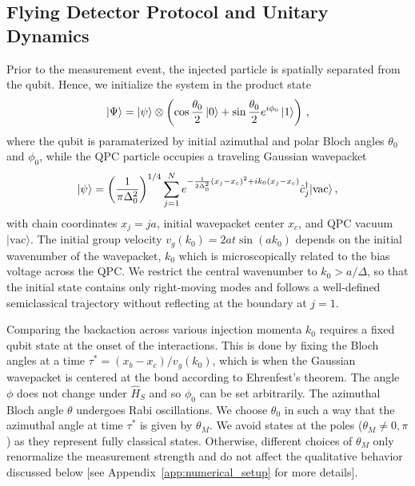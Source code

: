 \documentclass[10pt,
 amsmath,amssymb,
 aps,prb, twocolumn
]{revtex4-2}
\begin{document}
\subsection{Flying Detector Protocol and Unitary Dynamics}\label{sect:protocol}
Prior to the measurement event, the injected particle is spatially separated from the qubit. Hence, we initialize the system in the product state
\begin{equation}\label{eq:initial_state}
    \ket{\Psi} = \ket{\psi}\otimes\left(\cos{\frac{\theta_0}{2}}\ket{0}+\sin{\frac{\theta_0}{2}}e^{i\phi_0}\ket{1}\right) \,,
\end{equation}
where the qubit is paramaterized by initial azimuthal and polar Bloch angles $\theta_0$ and $\phi_0$, while the QPC particle occupies a traveling Gaussian wavepacket
\begin{equation}\label{eq:gauss_wavepacket}
    \ket{\psi} = \left(\frac{1}{\pi \Delta_0^2}\right)^{1 / 4} \sum_{j=1}^N e^{-\frac{1}{2 \Delta_0^2}\left(x_j-x_c\right)^2+i k_0\left(x_j-x_c\right)} \hat{c}_j^{\dagger}|\text{vac}\rangle \,,
\end{equation}
with chain coordinates $x_j=ja$, initial wavepacket center $x_c$, and QPC vacuum $|\text{vac}\rangle$. The initial group velocity $v_g(k_0) = 2at\sin(ak_0)$ depends on the initial wavenumber of the wavepacket, \mbox{$k_0$} which is microscopically related to the bias voltage across the QPC. We restrict the central wavenumber to $k_0 > a/\Delta$, so that the initial state contains only right-moving modes and follows a well-defined semiclassical trajectory without reflecting at the boundary at \mbox{$j=1$}.

Comparing the backaction across various injection momenta \mbox{$k_0$} requires a fixed qubit state at the onset of the interactions. This is done by fixing the Bloch angles at a time \mbox{$\tau^* = (x_b - x_c)/v_g(k_0)$}, which is when the Gaussian wavepacket is centered at the bond according to Ehrenfest's theorem. The angle \mbox{$\phi$} does not change under \mbox{$\hat{H}_S$} and so \mbox{$\phi_0$} can be set arbitrarily. The azimuthal Bloch angle \mbox{$\theta$} undergoes Rabi oscillations. We choose \mbox{$\theta_0$} in such a way that the azimuthal angle at time \mbox{$\tau^*$} is given by \mbox{$\theta_M$}. We avoid states at the poles ($\theta_M\neq 0, \pi$) as they represent fully classical states. Otherwise,  different choices of \mbox{$\theta_M$} only renormalize the measurement strength and do not affect the qualitative behavior discussed below [see Appendix~\ref{app:numerical_setup} for more details].
\end{document}
